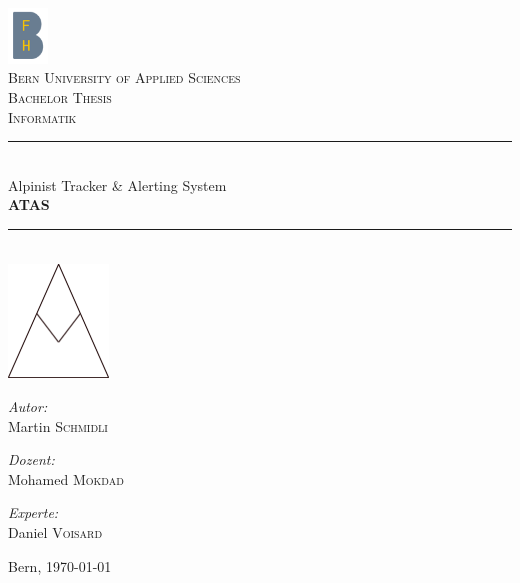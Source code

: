 \documentclass[11pt,english,german]{report}
\theoremstyle{definition}
\begin{document}
\pagestyle{empty} %
\begin{titlepage}
\begin{center}

\includegraphics[width=0.08\textwidth]{img/bfh_logo.png}\\[1cm]    
\textsc{\LARGE Bern University of Applied Sciences}\\[1.5cm]
\textsc{\Large Bachelor Thesis}\\[0.2cm]
\textsc{\Large Informatik}\\[0.5cm]

\newcommand{\HRule}{\rule{\linewidth}{0.3mm}}
\HRule \\[0.4cm]
{\huge Alpinist Tracker \& Alerting System}\\[0.3cm]
{\huge \bfseries  ATAS}
\HRule \\[2cm]

\includegraphics[width=0.2\textwidth]{img/atas_logo.png}\\[3cm]    

\begin{minipage}{0.32\textwidth}
\begin{flushleft} \large
\emph{Autor:}\\
Martin \textsc{Schmidli}\\
\end{flushleft}
\end{minipage}
\hfill
\begin{minipage}{0.32\textwidth}
\begin{flushleft} \large
\emph{Dozent:} \\
Mohamed \textsc{Mokdad}
\end{flushleft}
\end{minipage}
\hfill
\begin{minipage}{0.32\textwidth}
\begin{flushleft} \large
\emph{Experte:}\\
Daniel \textsc{Voisard}\\
\end{flushleft}
\end{minipage}

\vspace{20mm}

Bern, {\large \today}
\end{center}
\end{titlepage}
\pagestyle{fancy}
\end{document}
